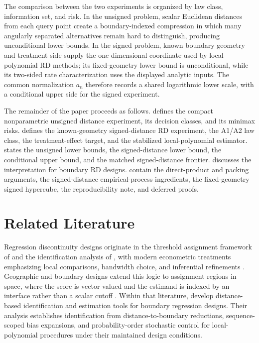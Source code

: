 \documentclass[11pt]{article}
\begin{document}
The comparison between the two experiments is organized by law class, information set, and risk. In the unsigned problem, scalar Euclidean distances from each query point create a boundary-indexed compression in which many angularly separated alternatives remain hard to distinguish, producing unconditional lower bounds. In the signed problem, known boundary geometry and treatment side supply the one-dimensional coordinate used by local-polynomial RD methods; its fixed-geometry lower bound is unconditional, while its two-sided rate characterization uses the displayed analytic inputs. The common normalization \(a_n\) therefore records a shared logarithmic lower scale, with a conditional upper side for the signed experiment.

The remainder of the paper proceeds as follows.  defines the compact nonparametric unsigned distance experiment, its decision classes, and its minimax risks.  defines the known-geometry signed-distance RD experiment, the A1/A2 law class, the treatment-effect target, and the stabilized local-polynomial estimator.  states the unsigned lower bounds, the signed-distance lower bound, the conditional upper bound, and the matched signed-distance frontier.  discusses the interpretation for boundary RD designs.  contain the direct-product and packing arguments, the signed-distance empirical-process ingredients, the fixed-geometry signed hypercube, the reproducibility note, and deferred proofs.


\section{Related Literature}
\label{sec:related-literature}

Regression discontinuity designs originate in the threshold assignment framework of \citet{Thistlethwaite1960} and the identification analysis of \citet{Hahn2001}, with modern econometric treatments emphasizing local comparisons, bandwidth choice, and inferential refinements \citep{Imbens2008,Lee2010,Imbens2012}. Geographic and boundary designs extend this logic to assignment regions in space, where the score is vector-valued and the estimand is indexed by an interface rather than a scalar cutoff \citep{Keele2015a,Keele2015b,Keele2016,Papay2011,Reardon2012,Wong2013,Choi2018,Diaz2023,Sawada2024,Merlano2025}. Within that literature, \citet{CattaneoTitiunikYu2026Distance} develop distance-based identification and estimation tools for boundary regression designs. Their analysis establishes identification from distance-to-boundary reductions, sequence-scoped bias expansions, and probability-order stochastic control for local-polynomial procedures under their maintained design conditions.
\end{document}

